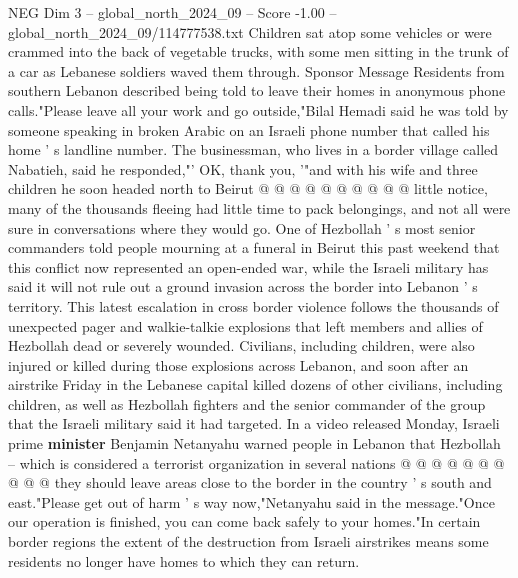 \begin{textsample}{NEG Dim 3 – global\_north\_2024\_09 – Score -1.00 – global\_north\_2024\_09/114777538.txt}
Children sat atop some vehicles or were crammed into the back of vegetable trucks, with some men sitting in the trunk of a car as Lebanese soldiers waved them through.
Sponsor Message Residents from southern Lebanon described being told to leave their homes in anonymous phone calls."Please leave all your work and go outside,"Bilal Hemadi said he was told by someone speaking in broken Arabic on an Israeli phone number that called his home ' s landline number.
The businessman, who lives in a border village called Nabatieh, said he responded,"' OK, thank you, '"and with his wife and three children he soon headed north to Beirut @ @ @ @ @ @ @ @ @ @ little notice, many of the thousands fleeing had little time to pack belongings, and not all were sure in conversations where they would go.
One of Hezbollah ' s most senior commanders told people mourning at a funeral in Beirut this past weekend that this conflict now represented an open-ended war, while the Israeli military has said it will not rule out a ground invasion across the border into Lebanon ' s territory.
This latest escalation in cross border violence follows the thousands of unexpected pager and walkie-talkie explosions that left members and allies of Hezbollah dead or severely wounded.
Civilians, including children, were also injured or killed during those explosions across Lebanon, and soon after an airstrike Friday in the Lebanese capital killed dozens of other civilians, including children, as well as Hezbollah fighters and the senior commander of the group that the Israeli military said it had targeted.
In a video released Monday, Israeli prime \textbf{minister} Benjamin Netanyahu warned people in Lebanon that Hezbollah -- which is considered a terrorist organization in several nations @ @ @ @ @ @ @ @ @ @ they should leave areas close to the border in the country ' s south and east."Please get out of harm ' s way now,"Netanyahu said in the message."Once our operation is finished, you can come back safely to your homes."In certain border regions the extent of the destruction from Israeli airstrikes means some residents no longer have homes to which they can return.

\end{textsample}
